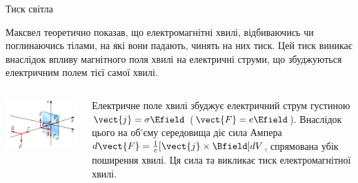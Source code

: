 \documentclass{beamer}
\begin{document}
\begin{frame}{Тиск світла}{}
	\begin{block}{}\justifying\small
		Максвел теоретично показав, що електромагнітні хвилі, відбиваючись чи поглинаючись тілами, на які  вони падають, чинять на них тиск. Цей тиск виникає внаслідок впливу магнітного поля хвилі на електричні струми, що збуджуються електричним полем тієї самої хвилі.
	\end{block}
    \vspace*{-1.25em}
	\begin{columns}
		\begin{column}{0.4\linewidth}
			\begin{center}
				\includegraphics[width=1\linewidth]{pictures/elmagpresure}
			\end{center}
		\end{column}
		\begin{column}{0.6\linewidth}
			\begin{block}{}\justifying\small
				Електричне поле хвилі збуджує електричний струм густиною $ \vect{j} = \sigma\Efield $ ($ \vect{F} = e\Efield $). Внаслідок цього на об'єму середовища діє сила Ампера $ d\vect{F} = \frac1c[\vect{j}\times\Bfield] dV$, спрямована убік поширення хвилі. Ця сила та викликає тиск електромагнітної хвилі.

                \medskip


\end{block}
\end{column}
\end{columns}
\end{frame}
\end{document}
